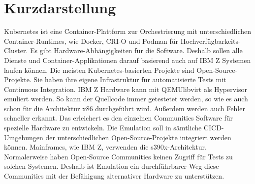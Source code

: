 \thispagestyle{empty}
\section*{Kurzdarstellung}
\label{sec:kurzdarstellung}
Kubernetes ist eine Container-Plattform zur Orchestrierung mit unterschiedlichen Container-Runtimes, wie Docker, CRI-O und Podman für Hochverfügbarkeits-Cluster. Es gibt Hardware-Abhängigkeiten für die Software. Deshalb sollen alle Dienste und Container-Applikationen darauf basierend auch auf IBM Z Systemen laufen können. Die meisten Kubernetes-basierten Projekte sind Open-Source-Projekte. Sie haben ihre eigene Infrastruktur für automatisierte Tests mit Continuous Integration. IBM Z Hardware kann mit QEMU\/libvirt als Hypervisor emuliert werden. So kann der Quellcode immer getestetet werden, so wie es auch schon für die Architektur x86 durchgeführt wird. Außerdem werden auch Fehler schneller erkannt. Das erleichert es den einzelnen Communities Software für spezielle Hardware zu entwickeln. Die Emulation soll in sämtliche CI\/CD-Umgebungen der unterschiedlichen Open-Source-Projekte integriert werden können. Mainframes, wie IBM Z, verwenden die s390x-Architektur. Normalerweise haben Open-Source Communities keinen Zugriff für Tests zu solchen Systemen. Deshalb ist Emulation ein durchführbarer Weg diese Communities mit der Befähigung alternativer Hardware zu unterstützen.

\blindtext


